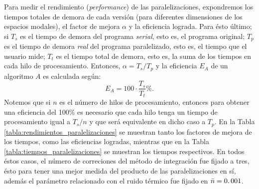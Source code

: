 \qquad Para medir el rendimiento (\emph{performance}) de las paralelizaciones, expondremos los tiempos totales de demora de cada versi\'on (para diferentes dimensiones de los espacios modales), el factor de mejora $\alpha$ y la eficiencia lograda. Para \'esto \'ultimo; si $T_s$ es el tiempo de demora del programa \emph{serial}, esto es, el programa original; $T_p$ es el tiempo de demora \emph{real} del programa paralelizado, esto es, el tiempo que el usuario mide; $T_t$ es el tiempo total de demora, esto es, la suma de los tiempos en cada hilo de procesamiento. Entonces, $\alpha=T_s/T_p$ y la eficiencia $E_A$ de un algoritmo $A$ es calculada seg\'un:
$$E_A=100\cdot\frac{T_s}{T_t}\%.$$
\qquad Notemos que si $n$ es el n\'umero de hilos de procesamiento, entonces para obtener una eficiencia del 100$\%$ es necesario que cada hilo tenga un tiempo de procesamiento igual a $T_s/n$ y que ser\'a equivalente en dicho caso a $T_p$. En la Tabla \ref{tabla:rendimientos_paralelizaciones} se muestran tanto los factores de mejora de los tiempos, como las eficiencias logradas, mientras que en la Tabla \ref{tabla:tiempos_paralelizaciones} se muestran los tiempos respectivos. En todos \'estos casos, el n\'umero de correciones del m\'etodo de integraci\'on fue fijado a tres, \'esto para tener una mejor medida del producto de las paralelizaciones en s\'i, adem\'as el par\'ametro relacionado con el ruido t\'ermico fue fijado en $\bar{n}=0\ldotp 001$.\\

